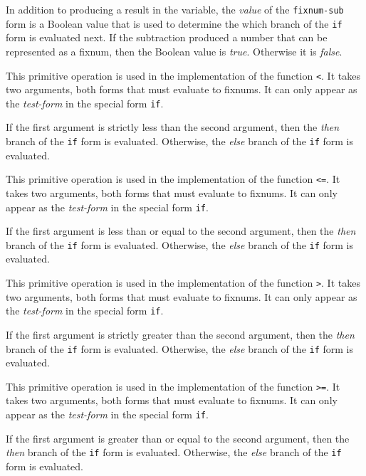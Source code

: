In addition to producing a result in the variable, the \emph{value}
of the \texttt{fixnum-sub} form is a Boolean value that is used to
determine the which branch of the \texttt{if} form is evaluated next.
If the subtraction produced a number that can be represented as a
fixnum, then the Boolean value is \emph{true}.  Otherwise it is
\emph{false}.

 {}

This primitive operation is used in the implementation of the
\commonlisp{} function \texttt{<}.  It takes two arguments, both forms
that must evaluate to fixnums.  It can only appear as the
\emph{test-form} in the special form \texttt{if}.

If the first argument is strictly less than the second argument, then
the \emph{then} branch of the \texttt{if} form is evaluated.
Otherwise, the \emph{else} branch of the \texttt{if} form is
evaluated.

 {}

This primitive operation is used in the implementation of the
\commonlisp{} function \texttt{<=}.  It takes two arguments, both
forms that must evaluate to fixnums.  It can only appear as the
\emph{test-form} in the special form \texttt{if}.

If the first argument is less than or equal to the second argument,
then the \emph{then} branch of the \texttt{if} form is evaluated.
Otherwise, the \emph{else} branch of the \texttt{if} form is
evaluated.

 {}

This primitive operation is used in the implementation of the
\commonlisp{} function \texttt{>}.  It takes two arguments, both
forms that must evaluate to fixnums.  It can only appear as the
\emph{test-form} in the special form \texttt{if}.

If the first argument is strictly greater than the second argument,
then the \emph{then} branch of the \texttt{if} form is evaluated.
Otherwise, the \emph{else} branch of the \texttt{if} form is
evaluated.

 {}

This primitive operation is used in the implementation of the
\commonlisp{} function \texttt{>=}.  It takes two arguments, both
forms that must evaluate to fixnums.  It can only appear as the
\emph{test-form} in the special form \texttt{if}.

If the first argument is greater than or equal to the second argument,
then the \emph{then} branch of the \texttt{if} form is evaluated.
Otherwise, the \emph{else} branch of the \texttt{if} form is
evaluated.

